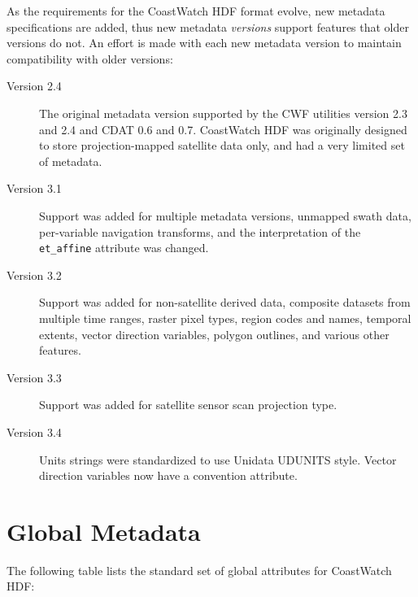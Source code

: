 As the requirements for the CoastWatch HDF format evolve, new metadata
specifications are added, thus new metadata {\em versions} support
features that older versions do not. An effort is made with each new
metadata version to maintain compatibility with older versions:
\begin{description}

  \item[Version 2.4] The original metadata version supported by the
  CWF utilities version 2.3 and 2.4 and CDAT 0.6 and 0.7. CoastWatch
  HDF was originally designed to store projection-mapped satellite
  data only, and had a very limited set of metadata.

  \item[Version 3.1] Support was added for multiple metadata versions,
  unmapped swath data, per-variable navigation transforms, and the
  interpretation of the {\tt et\_affine} attribute was changed.

  \item[Version 3.2] Support was added for non-satellite derived data,
  composite datasets from multiple time ranges, raster pixel types,
  region codes and names, temporal extents, vector direction
  variables, polygon outlines, and various other features.

  \item[Version 3.3] Support was added for satellite sensor scan
  projection type.

  \item[Version 3.4] Units strings were standardized to use Unidata
  UDUNITS style.  Vector direction variables now have a convention
  attribute.

\end{description}

\section{Global Metadata}

The following table lists the standard set of global attributes for
CoastWatch HDF:

